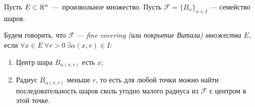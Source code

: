 \begin{definition}
    Пусть $E \subset \mathbb{R}^n$ — произвольное множество.
    Пусть $\mathcal{F} = \{B_\alpha\}_{\alpha \in I}$ — семейство шаров.

    Будем говорить, что $\mathcal{F}$ — \textit{fine covering (или покрытие Витали) множества $E$}, если $\forall x \in E \ \forall r > 0 \ \exists \alpha(x,r) \in I:$
    \begin{enumerate}
        \item Центр шара $B_{\alpha(x,r)}$ есть $x$;
        \item Радиус $B_{\alpha(x,r)}$ меньше $r$, то есть для любой точки можно найти последовательность шаров сколь угодно малого радиуса из $\mathcal{F}$ с центром в этой точке.
    \end{enumerate}
    
\end{definition} 

